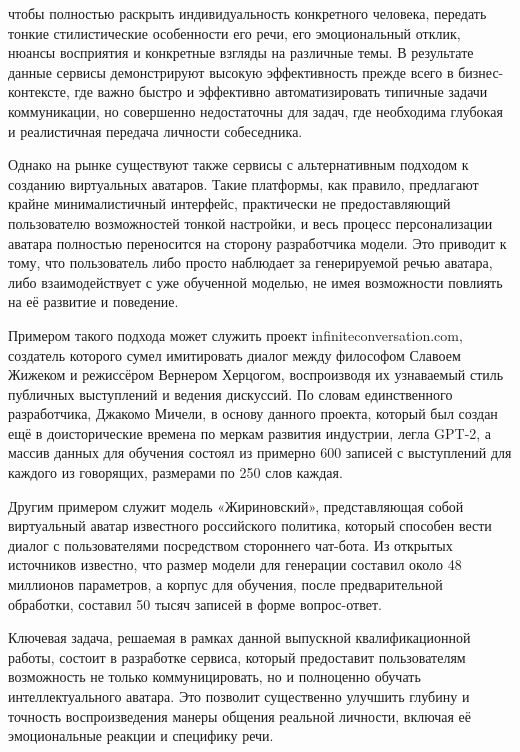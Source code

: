 чтобы полностью раскрыть индивидуальность конкретного человека, передать тонкие 
стилистические особенности его речи, его эмоциональный отклик, нюансы восприятия и 
конкретные взгляды на различные темы. В результате данные сервисы демонстрируют высокую 
эффективность прежде всего в бизнес-контексте, где важно быстро и эффективно 
автоматизировать типичные задачи коммуникации, но совершенно недостаточны для задач, где 
необходима глубокая и реалистичная передача личности собеседника.


Однако на рынке существуют также сервисы с альтернативным подходом к созданию виртуальных 
аватаров. Такие платформы, как правило, предлагают крайне минималистичный интерфейс, 
практически не предоставляющий пользователю возможностей тонкой настройки, и весь процесс 
персонализации аватара полностью переносится на сторону разработчика модели. Это приводит к 
тому, что пользователь либо просто наблюдает за генерируемой речью аватара, либо 
взаимодействует с уже обученной моделью, не имея возможности повлиять на её развитие и 
поведение.


Примером такого подхода может служить проект infiniteconversation.com, создатель которого 
сумел имитировать диалог между философом Славоем Жижеком и режиссёром Вернером Херцогом, 
воспроизводя их узнаваемый стиль публичных выступлений и ведения дискуссий. По словам 
единственного разработчика, Джакомо Мичели, в основу данного проекта, который был создан
ещё в доисторические времена по меркам развития индустрии, легла GPT-2, а массив 
данных для обучения состоял из примерно 600 записей с выступлений для каждого из говорящих,
размерами по 250 слов каждая.


Другим примером служит модель «Жириновский», представляющая собой виртуальный аватар 
известного российского политика, который способен вести диалог с пользователями посредством 
стороннего чат-бота. Из открытых источников \cite{Jiric} известно, что размер модели для 
генерации составил около 48 миллионов параметров, а корпус для обучения, после предварительной обработки, составил 50 тысяч 
записей в форме вопрос-ответ.

Ключевая задача, решаемая в рамках данной выпускной квалификационной работы, состоит в разработке сервиса, который предоставит пользователям возможность не только коммуницировать, но и полноценно обучать интеллектуального аватара. Это позволит существенно улучшить глубину и точность воспроизведения манеры общения реальной личности, включая её эмоциональные реакции и специфику речи.

